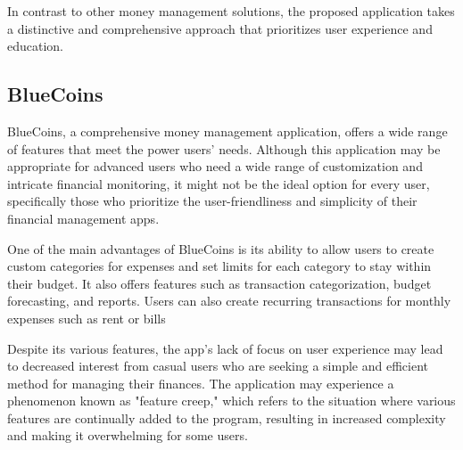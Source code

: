 \hspace{\parindent}In contrast to other money management solutions, the proposed application takes a distinctive and comprehensive approach that prioritizes user experience and education.


\subsection{BlueCoins}
\hspace{\parindent}BlueCoins, a comprehensive money management application, offers a wide range of features that meet the power users’ needs. Although this application may be appropriate for advanced users who need a wide range of customization and intricate financial monitoring, it might not be the ideal option for every user, specifically those who prioritize the user-friendliness and simplicity of their financial management apps.

\hspace{\parindent}One of the main advantages of BlueCoins is its ability to allow users to create custom categories for expenses and set limits for each category to stay within their budget. It also offers features such as transaction categorization, budget forecasting, and reports. Users can also create recurring transactions for monthly expenses such as rent or bills

\hspace{\parindent}Despite its various features, the app's lack of focus on user experience may lead to decreased interest from casual users who are seeking a simple and efficient method for managing their finances. The application may experience a phenomenon known as "feature creep," which refers to the situation where various features are continually added to the program, resulting in increased complexity and making it overwhelming for some users.

